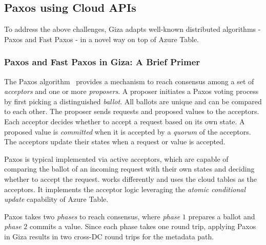 \subsection{Paxos using Cloud APIs}

To address the above challenges, Giza adapts well-known distributed algorithms
- Paxos and Fast Paxos - in a novel way on top of Azure Table.

\subsubsection{Paxos and Fast Paxos in Giza: A Brief Primer}

The Paxos algorithm~\cite{lamport01paxos} provides a mechanism to reach
consensus among a set of {\em acceptors} and one or more {\em proposers}.
A proposer initiates a Paxos voting process by first picking a distinguished {\em
  ballot}. All ballots are unique and can be compared to each other. The
proposer sends requests and proposed values to the acceptors.
Each acceptor decides whether to accept a request based on its
own state. A proposed value is {\em committed} when it is accepted by a {\em
  quorum} of the acceptors. The acceptors update their states when a request or
value is accepted.

Paxos is typical implemented via active acceptors, which are
capable of comparing the ballot of an incoming request with their own states and
deciding whether to accept the request.
\name works differently and uses the cloud tables as the acceptors.
It implements the acceptor logic leveraging the {\em atomic conditional update} capability of Azure Table.

Paxos takes two {\em phases} to reach consensus, where {\em phase} $1$ prepares
a ballot and {\em phase} $2$ commits a value. Since each phase takes one round
trip, applying Paxos in Giza results in two cross-DC round trips for the metadata path.


